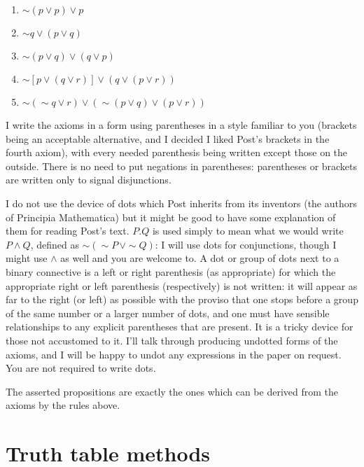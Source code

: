 \documentclass[12pt]{article}
\begin{document}
\begin{description}
\begin{enumerate}

\item $\sim(p \vee p) \vee p$

\item $\sim q \vee (p \vee q)$

\item $\sim(p \vee q) \vee (q \vee p)$

\item $\sim[p \vee (q \vee r)] \vee (q \vee (p \vee r))$

\item $\sim(\sim q \vee r) \vee (\sim (p \vee q) \vee (p \vee r))$

\end{enumerate}

I write the axioms in a form using parentheses in a style familiar to you (brackets being an acceptable alternative, and I decided I liked Post's brackets
in the fourth axiom), with every needed parenthesis being written except those on the outside.  There is no need to put negations in parentheses:
parentheses or brackets are written only to signal disjunctions.

I do not use the device of dots which Post inherits from its inventors (the authors of Principia Mathematica) but it might be good to have some explanation of them for reading Post's text.
$P.Q$ is used simply to mean what we would write $P \wedge Q$, defined as $\sim(\sim P \,\vee \sim Q)$:  I will use dots for conjunctions, though I might use $\wedge$ as well and you are welcome to.  A dot or group of dots next to a binary connective is a left or right parenthesis (as appropriate) for which the appropriate right or left parenthesis (respectively) is not written:
it will appear as far to the right (or left) as possible with the proviso that one stops before a group of the same number or a larger number of dots, and one must have sensible relationships to any explicit parentheses that are present.  It is a tricky device for those not accustomed to it.  I'll talk through producing undotted forms of the axioms, and I will be happy to undot any expressions in the paper on request.  You are not required to write dots.

\end{description}

The asserted propositions are exactly the ones which can be derived from the axioms by the rules above.

\section{Truth table methods}
\end{document}
